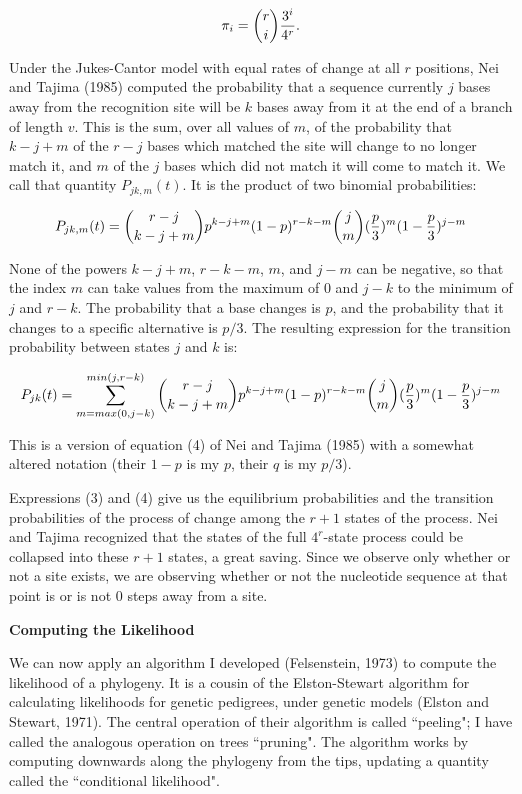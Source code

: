 \begin{equation} %
		\pi_i  =  {r \choose i}  {3^i \over 4^r} .
\end{equation}

Under the Jukes-Cantor model with equal rates of change at all $r$
positions, Nei and Tajima (1985) computed the probability that a sequence
currently $j$ bases away from the recognition site will be $k$
bases away from it at the end of a branch of length $v$.
This is the sum, over all values of $m$,
of the probability that $k-j+m$ of the $r-j$ bases which
matched the site will change to no longer match it, and $m$ of the $j$
bases which did not
match it will come to match it.  We call that quantity $P_{jk,m}(t)$.  It is
the product of two binomial probabilities:

\begin{equation} %
          P_{jk,m}(t)   =    {r-j \choose k-j+m} p^{k-j+m} (1-p)^{r-k-m} {j \choose m} ({p \over 3})^m (1-{p \over 3})^{j-m} 
\end{equation}

None of the powers $k-j+m$, $r-k-m$, $m$, and $j-m$ can be negative, so that
the index $m$
can take values from the maximum of 0 and $j-k$ to the minimum of $j$ and $r-k$.
The probability that a base changes is $p$, and the probability that
it changes to a specific alternative is $p/3$.  The resulting
expression for the transition probability between states $j$ and $k$ is:

\begin{equation} %
P_{jk}(t)   =   \sum_{m=max(0,j-k)}^{min(j, r-k)} {r-j \choose k-j+m} p^{k-j+m} (1-p)^{r-k-m}
{j \choose m} ({p \over 3})^m (1-{p \over 3})^{j-m}
\end{equation}

This is a version of equation (4) of Nei and Tajima (1985) with a somewhat
altered notation (their $1-p$ is my $p$, their $q$ is my $p/3$).

Expressions (3) and (4) give us the equilibrium probabilities and the transition
probabilities of the process of change among the $r+1$ states of the process.
Nei and Tajima recognized that the states of the full $4^r$-state process
could be collapsed into these $r+1$ states, a great saving.  Since we observe
only whether or not a site exists, we are observing whether or not the
nucleotide sequence at that point is or is not 0 steps away from a site.
\bigskip

\centerline{\bf Computing the Likelihood}

We can now apply an algorithm I developed (Felsenstein, 1973) to compute the
likelihood of a phylogeny.  It is a cousin of
the Elston-Stewart algorithm for calculating likelihoods for genetic pedigrees, under genetic models (Elston and Stewart, 1971).  The central operation of
their algorithm is called ``peeling"; I have called the analogous operation
on trees ``pruning".  The algorithm works by computing downwards along the
phylogeny from the tips, updating a quantity called the ``conditional likelihood".

